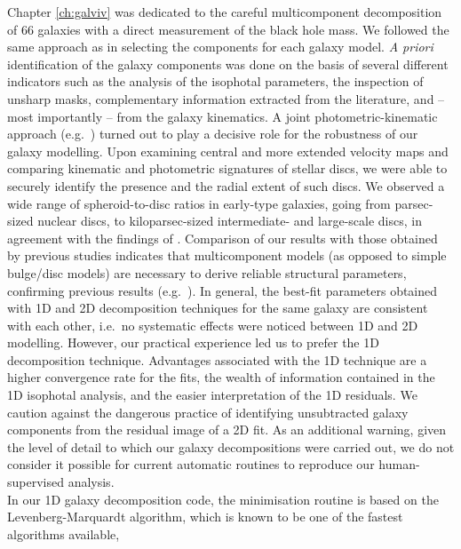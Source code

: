 Chapter \ref{ch:galviv} \citep{paperI} was dedicated to the careful multicomponent decomposition of 66 galaxies 
with a direct measurement of the black hole mass. 
We followed the same approach as \citet{laurikainen2005} in selecting the components for each galaxy model.  
\emph{A priori} identification of the galaxy components was done on the basis of several different indicators 
such as the analysis of the isophotal parameters, 
the inspection of unsharp masks, 
complementary information extracted from the literature, 
and -- most importantly -- from the galaxy kinematics. 
A joint photometric-kinematic approach (e.g.~\citealt{krajnovic2013,arnold2014}) 
turned out to play a decisive role for the robustness of our galaxy modelling. 
Upon examining central \citep{atlas3dIII,scott2014} and more extended \citep{arnold2014} velocity maps 
and comparing kinematic and photometric signatures of stellar discs, 
we were able to securely identify the presence and the radial extent of such discs. 
We observed a wide range of spheroid-to-disc ratios in early-type galaxies, 
going from parsec-sized nuclear discs, to kiloparsec-sized intermediate- and large-scale discs, 
in agreement with the findings of \citet{krajnovic2013}. 
Comparison of our results with those obtained by previous studies indicates that 
multicomponent models (as opposed to simple bulge/disc models) are necessary 
to derive reliable structural parameters, confirming previous results 
(e.g.~\citealt{laurikainen2005,laurikainen2007,laurikainen2010,lasker2014data,salo2015}). 
In general, the best-fit parameters obtained with 1D and 2D decomposition techniques for the same galaxy 
are consistent with each other, 
i.e.~no systematic effects were noticed between 1D and 2D modelling. 
However, our practical experience led us to prefer the 1D decomposition technique. 
Advantages associated with the 1D technique are a higher convergence rate for the fits, 
the wealth of information contained in the 1D isophotal analysis, 
and the easier interpretation of the 1D residuals. 
We caution against the dangerous practice of identifying unsubtracted galaxy components 
from the residual image of a 2D fit. 
As an additional warning, 
given the level of detail to which our galaxy decompositions were carried out, 
we do not consider it possible for current automatic routines to reproduce our human-supervised analysis. \\
In our 1D galaxy decomposition code, the minimisation routine is based on the Levenberg-Marquardt algorithm, 
which is known to be one of the fastest algorithms available, 

